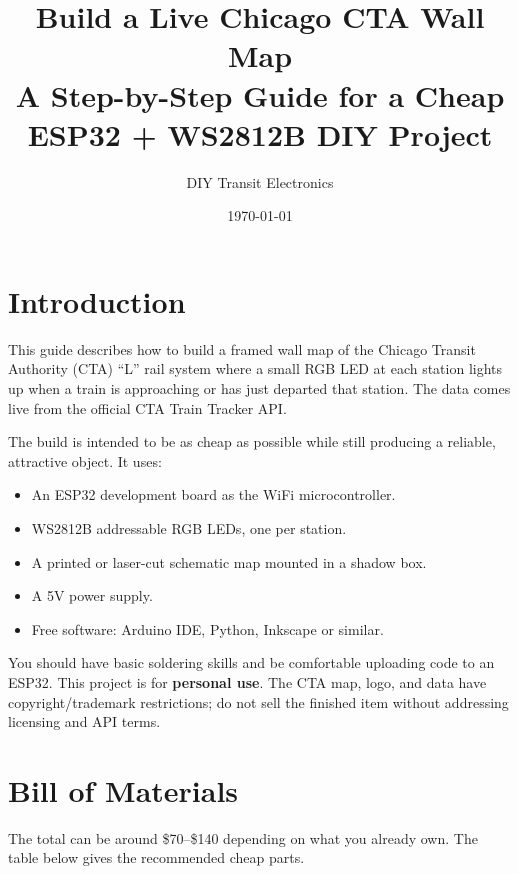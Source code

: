 \documentclass[11pt]{article}
\title{\textbf{Build a Live Chicago CTA Wall Map}\\\large A Step-by-Step Guide for a Cheap ESP32 + WS2812B DIY Project}
\author{DIY Transit Electronics}
\date{\today}
\begin{document}
\maketitle

\tableofcontents
\newpage

\section{Introduction}

This guide describes how to build a framed wall map of the Chicago Transit Authority (CTA) ``L'' rail system where a small RGB LED at each station lights up when a train is approaching or has just departed that station. The data comes live from the official CTA Train Tracker API.

The build is intended to be as cheap as possible while still producing a reliable, attractive object. It uses:

\begin{itemize}
    \item An ESP32 development board as the WiFi microcontroller.
    \item WS2812B addressable RGB LEDs, one per station.
    \item A printed or laser-cut schematic map mounted in a shadow box.
    \item A 5V power supply.
    \item Free software: Arduino IDE, Python, Inkscape or similar.
\end{itemize}

You should have basic soldering skills and be comfortable uploading code to an ESP32. This project is for \textbf{personal use}. The CTA map, logo, and data have copyright/trademark restrictions; do not sell the finished item without addressing licensing and API terms.

\section{Bill of Materials}

The total can be around \$70--\$140 depending on what you already own. The table below gives the recommended cheap parts.
\end{document}
